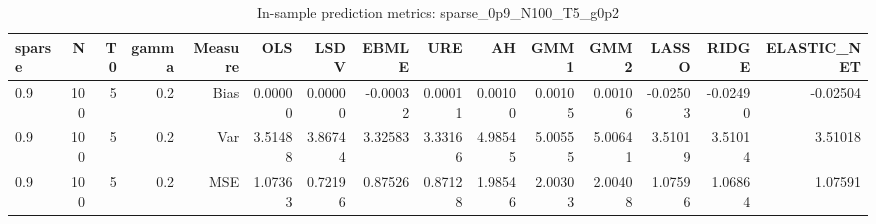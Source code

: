 \begin{table}[!htbp]\centering
\caption{In-sample prediction metrics: sparse_0p9_N100_T5_g0p2}
\label{tab:table2_sparse_0p9_N100_T5_g0p2}
\begin{tabular}{lrrrrrrrrrrrrrr}
\hline
sparse & N & T0 & gamma & Measure & OLS & LSDV & EBMLE & URE & AH & GMM1 & GMM2 & LASSO & RIDGE & ELASTIC_NET \\
\hline
0.9 & 100 & 5 & 0.2 & Bias & 0.00000 & 0.00000 & -0.00032 & 0.00011 & 0.00100 & 0.00105 & 0.00106 & -0.02503 & -0.02490 & -0.02504 \\
0.9 & 100 & 5 & 0.2 & Var & 3.51488 & 3.86744 & 3.32583 & 3.33166 & 4.98545 & 5.00555 & 5.00641 & 3.51019 & 3.51014 & 3.51018 \\
0.9 & 100 & 5 & 0.2 & MSE & 1.07363 & 0.72196 & 0.87526 & 0.87128 & 1.98546 & 2.00303 & 2.00408 & 1.07596 & 1.06864 & 1.07591 \\
\hline
\end{tabular}
\end{table}

